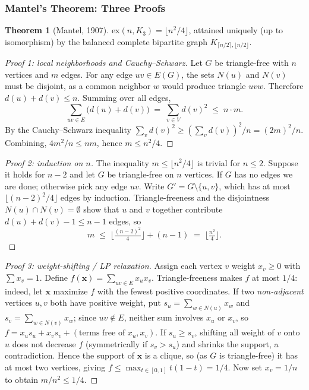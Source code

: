 \documentclass{article}
\theoremstyle{definition}
\newtheorem{theorem}{Theorem}
\begin{document}
\subsubsection{Mantel's Theorem: Three Proofs}

\begin{theorem}[Mantel, 1907]\label{thm:mantel}
$\mathrm{ex}(n, K_3) = \big\lfloor n^2/4 \big\rfloor$, attained uniquely
(up to isomorphism) by the balanced complete bipartite graph
$K_{\lceil n/2\rceil, \lfloor n/2\rfloor}$.
\end{theorem}

\begin{proof}[Proof 1: local neighborhoods and Cauchy--Schwarz]
Let $G$ be triangle-free with $n$ vertices and $m$ edges. For any edge
$uv \in E(G)$, the sets $N(u)$ and $N(v)$ must be disjoint, as a common
neighbor $w$ would produce triangle $uvw$. Therefore
$d(u) + d(v) \le n$. Summing over all edges,
\[
  \sum_{uv \in E} \big(d(u) + d(v)\big) \;=\; \sum_{v \in V} d(v)^2
  \;\le\; n \cdot m.
\]
By the Cauchy--Schwarz inequality $\sum_v d(v)^2 \ge (\sum_v d(v))^2 / n = (2m)^2 / n$.
Combining, $4m^2/n \le nm$, hence $m \le n^2/4$.
\end{proof}

\begin{proof}[Proof 2: induction on $n$]
The inequality $m \le \lfloor n^2/4 \rfloor$ is trivial for $n \le 2$.
Suppose it holds for $n - 2$ and let $G$ be triangle-free on $n$
vertices. If $G$ has no edges we are done; otherwise pick any edge
$uv$. Write $G' = G \setminus \{u, v\}$, which has at most
$\lfloor (n-2)^2/4 \rfloor$ edges by induction. Triangle-freeness and
the disjointness $N(u) \cap N(v) = \emptyset$ show that
$u$ and $v$ together contribute $d(u) + d(v) - 1 \le n - 1$ edges, so
\[
  m \;\le\; \Big\lfloor \tfrac{(n-2)^2}{4} \Big\rfloor + (n - 1)
     \;=\; \Big\lfloor \tfrac{n^2}{4} \Big\rfloor.
\]
\end{proof}

\begin{proof}[Proof 3: weight-shifting / LP relaxation]
Assign each vertex $v$ weight $x_v \ge 0$ with $\sum x_v = 1$. Define
$f(\mathbf{x}) = \sum_{uv \in E} x_u x_v$. Triangle-freeness makes
$f$ at most $1/4$: indeed, let $\mathbf{x}$ maximize $f$ with the
fewest positive coordinates. If two \emph{non-adjacent} vertices $u, v$
both have positive weight, put $s_u = \sum_{w \in N(u)} x_w$ and
$s_v = \sum_{w \in N(v)} x_w$; since $uv \notin E$, neither sum involves
$x_u$ or $x_v$, so $f = x_u s_u + x_v s_v + (\text{terms free of } x_u, x_v)$.
If $s_u \ge s_v$, shifting all weight of $v$ onto $u$ does not decrease $f$
(symmetrically if $s_v > s_u$) and shrinks the support, a contradiction.
Hence the support of $\mathbf{x}$ is a clique, so (as $G$ is triangle-free)
it has at most two vertices, giving $f \le \max_{t \in [0,1]} t(1 - t) = 1/4$.
Now set $x_v = 1/n$ to obtain $m/n^2 \le 1/4$.
\end{proof}
\end{document}
